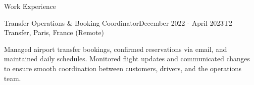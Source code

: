 \documentclass{resume} %
\begin{document}

\begin{rSection}{Work Experience}
\begin{rSubsection}{Transfer Operations \& Booking Coordinator}{December 2022 - April 2023}{T2 Transfer, Paris, France (Remote)}{}
\item Managed airport transfer bookings, confirmed reservations via email, and maintained daily schedules. Monitored flight updates and communicated changes to ensure smooth coordination between customers, drivers, and the operations team.
\end{rSubsection}
\end{rSection}

\end{document}
